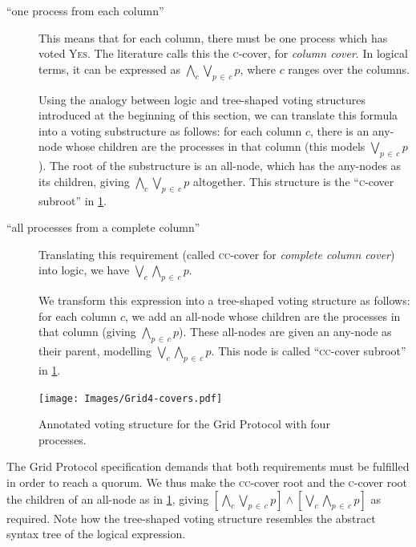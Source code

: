 \documentclass[12pt,chapterprefix=true,toc=bibliography,numbers=noendperiod,
               footnotes=multiple,twoside]{scrreprt}
\newcommand{\yes}{{\fontfamily{jkposn}\selectfont\textsc{Yes}}}
\begin{document}
\begin{description}
    \item[\enquote{one process from each column}] This means that for each column, there must be one process which has voted \yes. The literature calls this the \textsc{c}-cover, for \emph{column cover}. In logical terms, it can be expressed as \(\bigwedge_c \bigvee_{p\,\in\,c} p \), where \(c\) ranges over the columns.

        Using the analogy between logic and tree-shaped voting structures introduced at the beginning of this section, we can translate this formula into a voting substructure as follows: for each column \(c\), there is an any-node whose children are the processes in that column (this models \(\bigvee_{p\,\in\,c} p \)). The root of the substructure is an all-node, which has the any-nodes as its children, giving \(\bigwedge_c \bigvee_{p\,\in\,c} p \) altogether. This structure is the \enquote{\textsc{c}-cover subroot} in \cref{fig:grid4-covers}.

    \item[\enquote{all processes from a complete column}] Translating this requirement (called \textsc{cc}-cover for \emph{complete column cover}) into logic, we have \(\bigvee_c \bigwedge_{p\,\in\,c} p \).

        We transform this expression into a tree-shaped voting structure as follows: for each column \(c\), we add an all-node whose children are the processes in that column (giving \(\bigwedge_{p\,\in\,c} p \)). These all-nodes are given an any-node as their parent, modelling \(\bigvee_c \bigwedge_{p\,\in\,c} p \). This node is called \enquote{\textsc{cc}-cover subroot} in \cref{fig:grid4-covers}.
\end{description}

\begin{figure}[h]
    \centering
    \texttt{[image: Images/Grid4-covers.pdf]}
    \caption{Annotated voting structure for the Grid Protocol with four processes.}
    \label{fig:grid4-covers}
\end{figure}

The Grid Protocol specification demands that both requirements must be fulfilled in order to reach a quorum. We thus make the \textsc{cc}-cover root and the \textsc{c}-cover root the children of an all-node as in \cref{fig:grid4-covers}, giving \( \left[ \bigwedge_c \bigvee_{p\,\in\,c} p \right] \wedge \left[ \bigvee_c \bigwedge_{p\,\in\,c} p \right] \) as required. Note how the tree-shaped voting structure resembles the abstract syntax tree of the logical expression.
\end{document}

